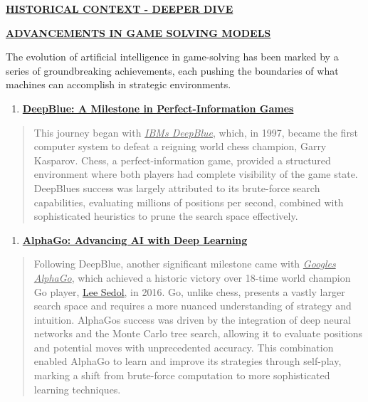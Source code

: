 \documentclass[
]{article}
\begin{document}
\textbf{\ul{HISTORICAL CONTEXT - DEEPER DIVE}}

\textbf{\ul{ADVANCEMENTS IN GAME SOLVING MODELS}}

The evolution of artificial intelligence in game-solving has been marked
by a series of groundbreaking achievements, each pushing the boundaries
of what machines can accomplish in strategic environments.

\begin{enumerate}
\def\labelenumi{\arabic{enumi}.}
\item
  \textbf{\ul{DeepBlue: A Milestone in Perfect-Information Games}}
\end{enumerate}

\begin{quote}
This journey began with \emph{\ul{IBM\textquotesingle s DeepBlue}},
which, in 1997, became the first computer system to defeat a reigning
world chess champion, Garry Kasparov. Chess, a perfect-information game,
provided a structured environment where both players had complete
visibility of the game state. DeepBlue\textquotesingle s success was
largely attributed to its brute-force search capabilities, evaluating
millions of positions per second, combined with sophisticated heuristics
to prune the search space effectively.
\end{quote}

\begin{enumerate}
\def\labelenumi{\arabic{enumi}.}
\setcounter{enumi}{1}
\item
  \textbf{\ul{AlphaGo: Advancing AI with Deep Learning}}
\end{enumerate}

\begin{quote}
Following DeepBlue, another significant milestone came with
\emph{\ul{Google\textquotesingle s AlphaGo}}, which achieved a historic
victory over 18-time world champion Go player,
\href{https://en.wikipedia.org/wiki/Lee_Sedol}{\ul{Lee Sedol}}, in 2016.
Go, unlike chess, presents a vastly larger search space and requires a
more nuanced understanding of strategy and intuition.
AlphaGo\textquotesingle s success was driven by the integration of deep
neural networks and the Monte Carlo tree search, allowing it to evaluate
positions and potential moves with unprecedented accuracy. This
combination enabled AlphaGo to learn and improve its strategies through
self-play, marking a shift from brute-force computation to more
sophisticated learning techniques.
\end{quote}
\end{document}
